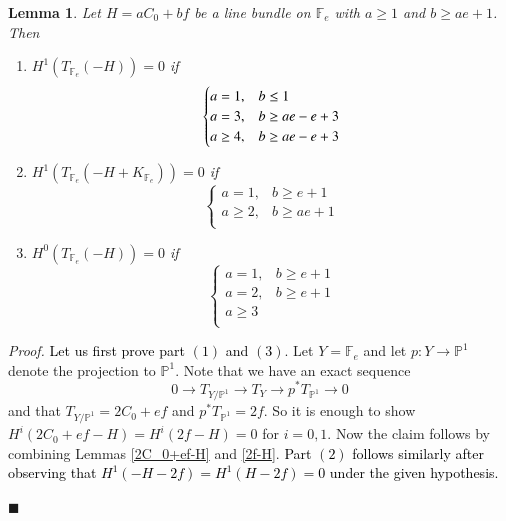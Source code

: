 \documentclass[11pt,twoside]{amsart}
\theoremstyle{plain}
\numberwithin{equation}{section}
\newtheorem{lemma}[theorem]{Lemma}
\theoremstyle{definition}
\newcommand*{\QEDA}{\hfill\ensuremath{\blacksquare}}
\begin{document}
\begin{lemma}\label{T_Y(-H)}
Let $H = aC_0+bf$ be a line bundle on $\mathbb{F}_e$ with $a \geq 1$ and $b \geq ae+1$. Then 
\begin{enumerate}
    \item[(1)] $H^1(T_{\mathbb{F}_e}(-H)) = 0$ if 
\[
\begin{cases}
   a = 1, & b \leq 1  \\
   a = 3, & b \geq ae-e+3 \\
   a \geq 4, &  \textcolor{black}{b \geq ae-e+3}
   
\end{cases}
\]

  \item[(2)] $H^1(T_{\mathbb{F}_e}(-H+K_{\mathbb{F}_e})) = 0$ if 
\[
\begin{cases}
   a = 1, & b \geq e+1  \\
   a \geq 2, & b \geq ae+1 \\
\end{cases}
\] 

\item[(3)] $H^0(T_{\mathbb{F}_e}(-H)) = 0$ if 
\[
\begin{cases}
   a = 1, & b \geq e+1  \\
   a = 2, & b \geq e+1 \\
   a \geq 3 & \\
\end{cases}
\] 

\end{enumerate}

\end{lemma}

\noindent\textit{Proof.} \textcolor{black}{Let us first prove part $(1)$ and $(3)$}. Let $Y = \mathbb{F}_e$ and let $p: Y \to \mathbb{P}^1$ denote the projection to $\mathbb{P}^1$. Note that we have an exact sequence 
$$0 \to T_{Y/\mathbb{P}^1} \to T_Y \to p^*T_{\mathbb{P}^1} \to 0$$
and that $T_{Y/\mathbb{P}^1} = 2C_0+ef$ and $p^*T_{\mathbb{P}^1} = 2f$. So it is enough to show $H^i(2C_0+ef-H) = H^i(2f-H) = 0$ for $i = 0,1$. Now the claim follows by combining Lemmas \ref{2C_0+ef-H} and \ref{2f-H}.
\textcolor{black}{Part $(2)$ follows similarly after observing that $H^1(-H-2f) = H^1(H-2f) = 0$ under the given hypothesis. }

\QEDA
\end{document}
